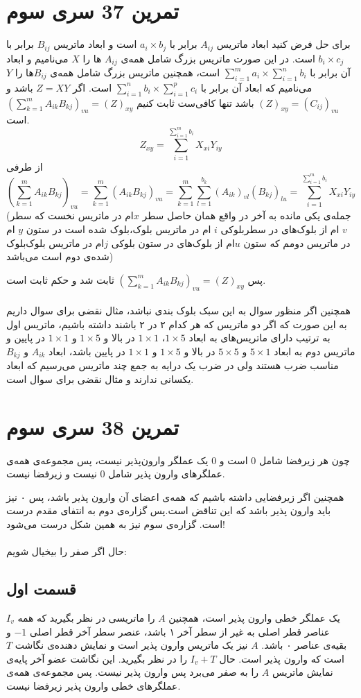 \documentclass[12pt,a4paper]{article}
\begin{document}
\section{تمرین 37 سری سوم}
برای حل فرض کنید ابعاد ماتریس $A_{ij}$ برابر با 
$a_i \times b_j$
است و ابعاد ماتریس 
$B_{ij}$
برابر با
$b_i \times c_j$
است. در این صورت ماتریس بزرگ شامل همه‌ی 
$A_{ij}$
ها را $X$ می‌نامیم و ابعاد آن برابر با
$\sum_{i=1}^m a_i \times \sum_{i=1}^n b_i$
است، همچنین ماتریس بزرگ شامل همه‌ی $B_{ij}$‌ها را $Y$ می‌نامیم که ابعاد آن برابر با 
$\sum_{i=1}^n b_i \times \sum_{i=1}^p c_i$
است. اگر $Z=XY$ باشد و
$(Z)_{xy} = (C_{ij})_{vu}$
باشد تنها کافی‌ست ثابت کنیم
$(\sum_{k=1}^m A_{ik} B_{kj})_{vu} = (Z)_{xy}$
است.
$$Z_{xy} = \sum_{i=1}^{\sum_{i=1}^m b_i} X_{xi} Y_{iy}$$
از طرفی
$$(\sum_{k=1}^m A_{ik} B_{kj})_{vu}
= \sum_{k=1}^m (A_{ik} B_{kj})_{vu}
= \sum_{k=1}^m \sum_{l=1}^{b_k}(A_{ik})_{vl}(B_{kj})_{lu}
= \sum_{i=1}^{\sum_{i=1}^m b_i} X_{xi} Y_{iy}
$$
(جمله‌ی یکی مانده به آخر در واقع همان حاصل سطر $x$ام در ماتریس نخست که سطر $v$ ام از بلوک‌های در سطربلوکی $i$ ام در ماتریس بلوک،بلوک شده است در ستون $y$ ام در ماتریس دومم که ستون $u$ام از بلوک‌های در ستون بلوکی $j$ام در ماتریس بلوک‌بلوک شده‌ی دوم است می‌باشد)

پس 
$(\sum_{k=1}^m A_{ik} B_{kj})_{vu} = (Z)_{xy}$
ثابت شد و حکم ثابت است.
\\
\\
همچنین اگر منظور سوال به این سبک بلوک بندی نباشد، مثال نقضی برای سوال داریم به این صورت که اگر دو ماتریس که هر کدام ۲ در ۲ باشند داشته باشیم، ماتریس اول به ترتیب دارای ماتریس‌های به ابعاد $1\times5$، $1\times 1$ در بالا و $1\times 5$ و $1\times 1$ در پایین و ماتریس دوم به ابعاد $5\times 1$ و $5\times 5$ در بالا و $1\times 5$ و $1\times 1$ در پایین باشد، ابعاد $A_{ik}$ و $B_{kj}$ مناسب ضرب هستند ولی در ضرب یک درایه به جمع چند ماتریس  می‌رسیم که ابعاد یکسانی ندارند و مثال نقضی برای سوال است.
\section{تمرین 38 سری سوم}
چون هر زیرفضا شامل 0 است و 0 یک عملگر وارون‌پذیر نیست، پس مجموعه‌ی همه‌ی عملگرهای وارون پذیر شامل 0 نیست و زیرفضا نیست.

همچنین اگر زیرفضایی داشته باشیم که همه‌ی اعضای آن وارون پذیر باشد، پس ۰ نیز باید وارون پذیر باشد که این تناقض است.پس گزاره‌ی دوم به انتفای مقدم درست است. گزاره‌ی سوم نیز به همین شکل درست می‌شود!
\\
\\
حال اگر صفر را بیخیال شویم:
\\
\subsection{قسمت اول}
$I_v$
یک عملگر خطی وارون پذیر است، همچنین $A$ را ماتریسی در نظر بگیرید که همه عناصر قطر اصلی به غیر از سطر آخر ۱ باشد، عنصر سطر آخر قطر اصلی $-1$ و بقیه‌ی عناصر ۰ باشد. $A$ نیز یک ماتریس وارون پذیر است و نمایش دهنده‌ی نگاشت $T$ است که وارون پذیر است. حال $I_v+T$ را در نظر بگیرید. این نگاشت عضو آخر پایه‌ی نمایش ماتریس $A$ را به صفر می‌برد پس وارون پذیر نیست. پس مجموعه‌ی همه‌ی عملگرهای خطی وارون پذیر زیرفضا نیست.
\end{document}
